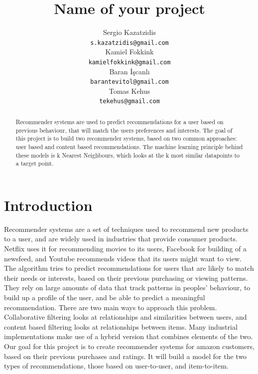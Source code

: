 \documentclass[11pt]{article}
\title{Name of your project}
\author{Sergio Kazatzidis \\
    {\tt s.kazatzidis@gmail.com} \\
    Kamiel Fokkink \\
    {\tt kamielfokkink@gmail.com} \\\And
    Baran İşcanlı \\
    {\tt barantevitol@gmail.com} \\
    Tomas Kehus \\
    {\tt tekehus@gmail.com}}
\date{}
\begin{document}
\maketitle
\begin{abstract}
    Recommender systems are used to predict recommendations for a user based on previous behaviour, that will match the users preferences and interests. The goal of this project is to build two recommender systems, based on two common approaches: user based and content based recommendations. The machine learning principle behind these models is k Nearest Neighbours, which looks at the k most similar datapoints to a target point.
\end{abstract}

\noindent

\section{Introduction}
Recommender systems are a set of techniques used to recommend new products to a user, and are widely used in industries that provide consumer products. Netflix uses it for recommending movies to its users, Facebook for building of a newsfeed, and Youtube recommends videos that its users might want to view. The algorithm tries to predict recommendations for users that are likely to match their needs or interests, based on their previous purchasing or viewing patterns. They rely on large amounts of data that track patterns in peoples' behaviour, to build up a profile of the user, and be able to predict a meaningful recommendation. There are two main ways to approach this problem. Collaborative filtering looks at relationships and similarities between users, and content based filtering looks at relationships between items. Many industrial implementations make use of a hybrid version that combines elements of the two. Our goal for this project is to create recommender systems for amazon customers, based on their previous purchases and ratings. It will build a model for the two types of recommendations, those based on user-to-user, and item-to-item. \\
\end{document}
